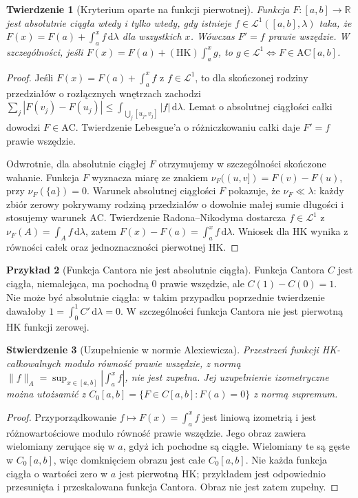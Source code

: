 \documentclass[11pt,a4paper]{article}
\numberwithin{equation}{section}
\theoremstyle{plain}
\newtheorem{twierdzenie}{Twierdzenie}[section]
\newtheorem{stwierdzenie}[twierdzenie]{Stwierdzenie}
\theoremstyle{definition}
\newtheorem{przyklad}[twierdzenie]{Przykład}
\theoremstyle{remark}
\newcommand{\R}{\mathbb R}
\newcommand{\AC}{\mathrm{AC}}
\newcommand{\HK}{\mathrm{HK}}
\begin{document}
\begin{twierdzenie}[Kryterium oparte na funkcji pierwotnej]
Funkcja $F:[a,b]\to\R$ jest absolutnie ciągła wtedy i tylko wtedy, gdy istnieje $f\in\mathcal L^1([a,b],\lambda)$ taka, że $F(x)=F(a)+\int_a^x f\,\mathrm d\lambda$ dla wszystkich $x$. Wówczas $F'=f$ prawie wszędzie. W szczególności, jeśli $F(x)=F(a)+(\HK)\int_a^x g$, to
$g\in\mathcal L^1\Longleftrightarrow F\in\AC[a,b]$.
\end{twierdzenie}
\begin{proof}
Jeśli $F(x)=F(a)+\int_a^x f$ z $f\in\mathcal L^1$, to dla skończonej rodziny przedziałów o rozłącznych wnętrzach zachodzi
$\sum_j|F(v_j)-F(u_j)|\le\int_{\bigcup_j[u_j,v_j]}|f|\,\mathrm d\lambda$. Lemat o absolutnej ciągłości całki dowodzi $F\in\AC$. Twierdzenie Lebesgue'a o różniczkowaniu całki daje $F'=f$ prawie wszędzie.

Odwrotnie, dla absolutnie ciągłej $F$ otrzymujemy w szczególności skończone wahanie. Funkcja $F$ wyznacza miarę ze znakiem $\nu_F((u,v])=F(v)-F(u)$, przy $\nu_F(\{a\})=0$. Warunek absolutnej ciągłości $F$ pokazuje, że $\nu_F\ll\lambda$: każdy zbiór zerowy pokrywamy rodziną przedziałów o dowolnie małej sumie długości i stosujemy warunek $\AC$. Twierdzenie Radona--Nikodyma dostarcza $f\in\mathcal L^1$ z $\nu_F(A)=\int_A f\,\mathrm d\lambda$, zatem $F(x)-F(a)=\int_a^x f\,\mathrm d\lambda$. Wniosek dla HK wynika z równości całek oraz jednoznaczności pierwotnej HK.
\end{proof}
\begin{przyklad}[Funkcja Cantora nie jest absolutnie ciągła]
Funkcja Cantora $C$ jest ciągła, niemalejąca, ma pochodną $0$ prawie wszędzie, ale $C(1)-C(0)=1$. Nie może być absolutnie ciągła: w takim przypadku poprzednie twierdzenie dawałoby $1=\int_0^1 C'\,\mathrm d\lambda=0$. W szczególności funkcja Cantora nie jest pierwotną HK funkcji zerowej.
\end{przyklad}
\begin{stwierdzenie}[Uzupełnienie w normie Alexiewicza]
Przestrzeń funkcji HK-całkowalnych modulo równość prawie wszędzie, z normą $\|f\|_A=\sup_{x\in[a,b]}|\int_a^x f|$, nie jest zupełna. Jej uzupełnienie izometryczne można utożsamić z $C_0[a,b]=\{F\in C[a,b]:F(a)=0\}$ z normą supremum.
\end{stwierdzenie}
\begin{proof}
Przyporządkowanie $f\mapsto F(x)=\int_a^x f$ jest liniową izometrią i jest różnowartościowe modulo równość prawie wszędzie. Jego obraz zawiera wielomiany zerujące się w $a$, gdyż ich pochodne są ciągłe. Wielomiany te są gęste w $C_0[a,b]$, więc domknięciem obrazu jest całe $C_0[a,b]$. Nie każda funkcja ciągła o wartości zero w $a$ jest pierwotną HK; przykładem jest odpowiednio przesunięta i przeskalowana funkcja Cantora. Obraz nie jest zatem zupełny.
\end{proof}
\end{document}
